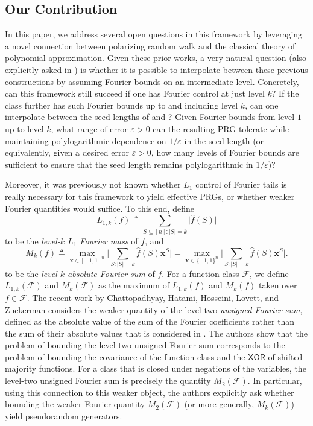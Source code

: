 \documentclass[10pt,a4paper]{article}
\newcommand{\eps}{\varepsilon}
\theoremstyle{definition}
\begin{document}
\subsection{Our Contribution}\label{intro:results}
{In this paper, we address several open questions in this framework by leveraging a novel connection between polarizing random walk and the classical theory of polynomial approximation.} Given these {prior} works, a very natural question (also explicitly asked in \cite{CHLT}) is whether it is possible to interpolate between these {previous} constructions by assuming Fourier bounds on an intermediate level. Concretely, can this framework still succeed if one has Fourier control at just level $k$? If the class further has such Fourier bounds up to and including level $k$, can one interpolate between the seed lengths of \cite{CHHL} and \cite{CHLT}? Given Fourier bounds from level $1$ up to level $k$, what range of error $\eps>0$ can the resulting PRG tolerate while maintaining polylogarithmic dependence on $1/\eps$ in the seed length (or equivalently, given a desired error $\eps>0$, how many levels of Fourier bounds are sufficient to ensure that the seed length remains polylogarithmic in $1/\eps$)?

Moreover, {it was previously not known whether $L_1$ control of Fourier tails is really necessary for this framework to yield effective PRGs, or whether weaker Fourier quantities would suffice. To this end, define
\begin{equation*}
    L_{1,k}(f)\triangleq \sum_{S\subseteq [n]:\vert S\vert=k} \vert \hat{f}(S)\vert
\end{equation*}
to be the \emph{level-$k$ $L_1$ Fourier mass} of $f$, and 
\begin{equation*}
    M_k(f)\triangleq \max_{\mathbf{x}\in [-1,1]^n}\bigg\vert \sum_{S:\vert S\vert=k} \hat{f}(S)\mathbf{x}^S\bigg\vert =  \max_{\mathbf{x}\in \{-1,1\}^n}\bigg\vert \sum_{S:\vert S\vert=k} \hat{f}(S)\mathbf{x}^S\bigg\vert .
\end{equation*}
to be the \emph{level-$k$ absolute Fourier sum} of $f$.
For a function class $\mathcal{F}$, we define $L_{1,k}(\mathcal{F})$ and $M_k( \mathcal{F} )$ as the maximum of $L_{1,k}(f)$ and $M_k(f)$ taken over $f\in \mathcal{F}$.}  The recent work by Chattopadhyay, Hatami, Hosseini, Lovett, and Zuckerman \cite{xorlemma} considers the weaker quantity of the level-two {\em unsigned Fourier sum}, defined as the absolute value of the sum of the Fourier coefficients rather than the sum of their absolute values that is considered in \cite{CHHL,CHLT}.  The authors show that the problem of bounding the level-two unsigned Fourier sum corresponds to the problem of bounding the covariance of the function class and the $\mathsf{XOR}$ of shifted majority functions. {For a class that is closed under negations of the variables, the level-two unsigned Fourier sum is precisely the quantity $M_2(\mathcal{F})$.} In particular, using this connection to this weaker object, the authors explicitly ask whether bounding the weaker Fourier quantity $M_2(\mathcal{F})$ (or more generally, $M_k(\mathcal{F})$) yield pseudorandom generators.
\end{document}
